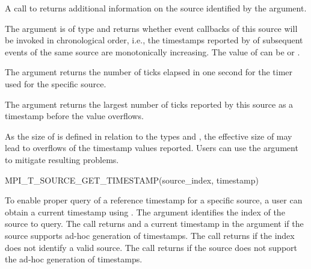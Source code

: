 A call to  returns additional
information on the source identified by the 
argument.



The  argument is of type  and returns whether event callbacks of this
source will be invoked in chronological order, i.e., the timestamps reported by
 of subsequent events of the same source are
monotonically increasing. The value of  can be
 or .

The  argument returns the number of ticks elapsed in
one second for the timer used for the specific source.

The  argument returns the largest number of ticks
reported by this source as a timestamp before the value overflows.

\begin{users}
    As the size of  is defined in relation to the types
     and , the effective size of
     may lead to overflows of the timestamp values
    reported.  Users can use the argument  to
    mitigate resulting problems.
\end{users}



\begin{funcdef}{MPI\_T\_SOURCE\_GET\_TIMESTAMP}{(\mbox{source\_index}, \mbox{timestamp})}
\end{funcdef}

To enable proper query of a reference timestamp for a specific source, a
user can obtain a current timestamp using
.  The argument
 identifies the index of the source to query.  The
call returns  and a current timestamp in the argument
 if the source supports ad-hoc generation of timestamps.
The call returns  if the index does not
identify a valid source.  The call returns
 if the source does not support the
ad-hoc generation of timestamps.


